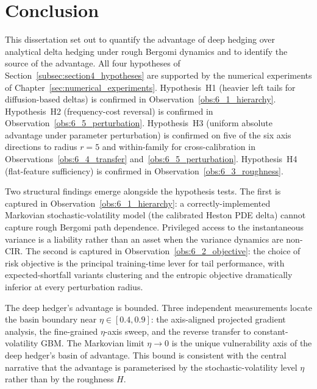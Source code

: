 \documentclass[12pt,a4paper]{article}
\theoremstyle{definition}
\theoremstyle{plain}
\theoremstyle{remark}
\theoremstyle{plain}
\begin{document}
\newpage

\section{Conclusion}
\label{sec:conclusion}

This dissertation set out to quantify the advantage of deep hedging
over analytical delta hedging under rough Bergomi dynamics and to
identify the source of the advantage. All four hypotheses of
Section~\ref{subsec:section4_hypotheses} are supported by the
numerical experiments of Chapter~\ref{sec:numerical_experiments}.
Hypothesis~H1 (heavier left tails for diffusion-based deltas) is
confirmed in Observation~\ref{obs:6_1_hierarchy}. Hypothesis~H2
(frequency-cost reversal) is confirmed in
Observation~\ref{obs:6_5_perturbation}. Hypothesis~H3 (uniform
absolute advantage under parameter perturbation) is confirmed on
five of the six axis directions to radius $r = 5$ and within-family
for cross-calibration in
Observations~\ref{obs:6_4_transfer} and~\ref{obs:6_5_perturbation}.
Hypothesis~H4 (flat-feature sufficiency) is confirmed in
Observation~\ref{obs:6_3_roughness}.

Two structural findings emerge alongside the hypothesis tests. The
first is captured in Observation~\ref{obs:6_1_hierarchy}: a
correctly-implemented Markovian stochastic-volatility model (the
calibrated Heston PDE delta) cannot capture rough Bergomi path
dependence. Privileged access to the instantaneous variance is a
liability rather than an asset when the variance dynamics are
non-CIR. The second is captured in
Observation~\ref{obs:6_2_objective}: the choice of risk objective
is the principal training-time lever for tail performance, with
expected-shortfall variants clustering and the entropic objective
dramatically inferior at every perturbation radius.

The deep hedger's advantage is bounded. Three independent
measurements locate the basin boundary near $\eta \in [0.4, 0.9]$:
the axis-aligned projected gradient analysis, the fine-grained
$\eta$-axis sweep, and the reverse transfer to constant-volatility
GBM. The Markovian limit $\eta \to 0$ is the unique vulnerability
axis of the deep hedger's basin of advantage. This bound is
consistent with the central narrative that the advantage is
parameterised by the stochastic-volatility level $\eta$ rather than
by the roughness $H$.
\end{document}
